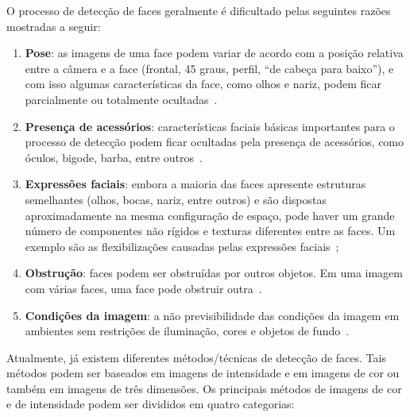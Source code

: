 O processo de detecção de faces geralmente é dificultado pelas seguintes razões mostradas a seguir:

	\begin{enumerate}
		\item \textbf{Pose}: as imagens de uma face podem variar de acordo com a posição relativa entre a câmera e a face (frontal, 45 graus, perfil, ``de cabeça para baixo''), e com isso algumas características da face, como olhos e nariz, podem ficar parcialmente ou totalmente ocultadas~\cite{yang}.
		\item \textbf{Presença de acessórios}: características faciais básicas importantes para o processo de detecção podem ficar ocultadas pela presença de acessórios, como óculos, bigode, barba, entre outros~\cite{oliveira, yang}. 
		\item \textbf{Expressões faciais}: embora a maioria das faces apresente estruturas semelhantes (olhos, bocas, nariz, entre outros) e são dispostas aproximadamente na mesma configuração de espaço, pode haver um grande número de componentes não rígidos e texturas diferentes entre as faces. Um exemplo são as flexibilizações causadas pelas expressões faciais~\cite{oliveira, yang};
		\item \textbf{Obstrução}: faces podem ser obstruídas por outros objetos. Em uma imagem com várias faces, uma face pode obstruir outra~\cite{yang}.
		\item \textbf{Condições da imagem}: a não previsibilidade das condições da imagem em ambientes sem restrições de iluminação, cores e objetos de fundo~\cite{oliveira, yang}.
	\end{enumerate}

Atualmente, já existem diferentes métodos/técnicas de detecção de faces. Tais métodos podem ser baseados em imagens de intensidade e em imagens de cor ou também em imagens de três dimensões. Os principais métodos de imagens de cor e de intensidade podem ser divididos em quatro categorias:

